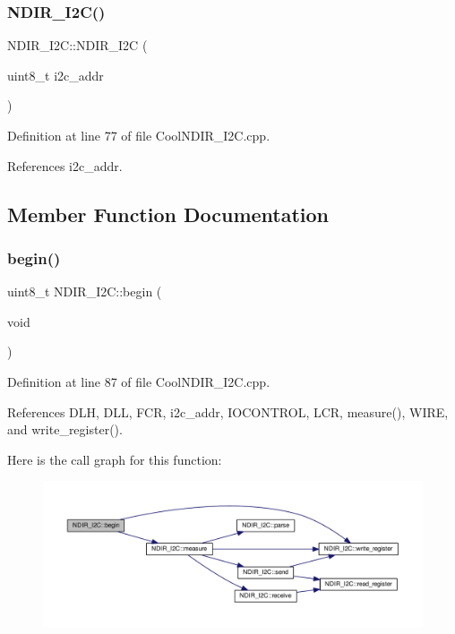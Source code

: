 \subsubsection{\texorpdfstring{N\+D\+I\+R\+\_\+\+I2\+C()}{NDIR\_I2C()}}
{\footnotesize\ttfamily N\+D\+I\+R\+\_\+\+I2\+C\+::\+N\+D\+I\+R\+\_\+\+I2C (\begin{DoxyParamCaption}\item[{uint8\+\_\+t}]{i2c\+\_\+addr }\end{DoxyParamCaption})}



Definition at line 77 of file Cool\+N\+D\+I\+R\+\_\+\+I2\+C.\+cpp.



References i2c\+\_\+addr.



\subsection{Member Function Documentation}
\mbox{\label{class_n_d_i_r___i2_c_acf82f3dcb41e75709a93f8b68d087a3c}} 
\subsubsection{\texorpdfstring{begin()}{begin()}}
{\footnotesize\ttfamily uint8\+\_\+t N\+D\+I\+R\+\_\+\+I2\+C\+::begin (\begin{DoxyParamCaption}\item[{void}]{ }\end{DoxyParamCaption})}



Definition at line 87 of file Cool\+N\+D\+I\+R\+\_\+\+I2\+C.\+cpp.



References D\+LH, D\+LL, F\+CR, i2c\+\_\+addr, I\+O\+C\+O\+N\+T\+R\+OL, L\+CR, measure(), W\+I\+RE, and write\+\_\+register().

Here is the call graph for this function\+:
\nopagebreak
\begin{figure}[H]
\begin{center}
\leavevmode
\includegraphics[width=350pt]{d6/ddb/class_n_d_i_r___i2_c_acf82f3dcb41e75709a93f8b68d087a3c_cgraph}
\end{center}
\end{figure}
\mbox{\label{class_n_d_i_r___i2_c_ab8f50d38501d498b802b822bd4844ede}} 
